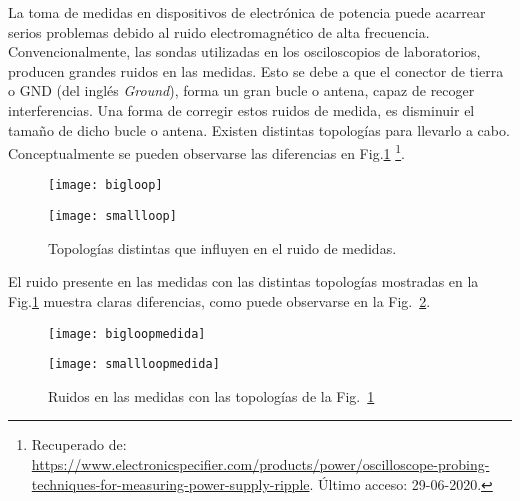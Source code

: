 \documentclass{report}
\begin{document}
La toma de medidas en dispositivos de electrónica de potencia puede acarrear serios problemas debido al ruido electromagnético de alta frecuencia. Convencionalmente, las sondas utilizadas en los osciloscopios de laboratorios, producen grandes ruidos en las medidas. Esto se debe a que el conector de tierra o GND (del inglés \textit{Ground}), forma un gran bucle o antena, capaz de recoger interferencias. Una forma de corregir estos ruidos de medida, es disminuir el tamaño de dicho bucle o antena. Existen distintas topologías para llevarlo a cabo. Conceptualmente se pueden observarse las diferencias en Fig.\ref{fig.ruidomedida} \footnote{Recuperado de: \url{https://www.electronicspecifier.com/products/power/oscilloscope-probing-techniques-for-measuring-power-supply-ripple}. Último acceso: 29-06-2020.}.

\begin{figure}
    \begin{minipage}[b]{.5\linewidth}
    \centering \texttt{[image: bigloop]}
    \label{fig.bigloop}
    \end{minipage}%
    \begin{minipage}[b]{.5\linewidth}
    \centering \texttt{[image: smallloop]}
    \label{fig.smallloop}
    \end{minipage}
    \caption{Topologías distintas que influyen en el ruido de medidas.} \label{fig.ruidomedida}
\end{figure}
    
El ruido presente en las medidas con las distintas topologías mostradas en la Fig.\ref{fig.ruidomedida} muestra claras diferencias, como puede observarse en la Fig.~\ref{fig.medidaruido}.

\begin{figure}
    \begin{minipage}[b]{.5\linewidth}
    \centering \texttt{[image: bigloopmedida]}
    \label{fig.bigloopmedida}
    \end{minipage}%
    \begin{minipage}[b]{.5\linewidth}
    \centering \texttt{[image: smallloopmedida]}
    \label{fig.smallloopmedida}
    \end{minipage}
    \caption{Ruidos en las medidas con las topologías de la Fig.~\ref{fig.ruidomedida}} \label{fig.medidaruido}
\end{figure}
\end{document}
